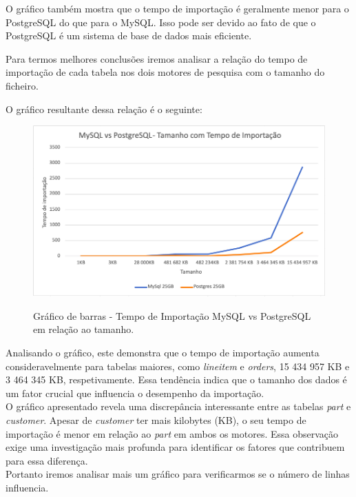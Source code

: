 \documentclass{article}
\begin{document}
O gráfico também mostra que o tempo de importação é geralmente menor para o PostgreSQL do que para o MySQL. Isso pode ser devido ao fato de que o PostgreSQL é um sistema de base de dados mais eficiente.

Para termos melhores conclusões iremos analisar a relação do tempo de importação de cada tabela nos dois motores de pesquisa com o tamanho do ficheiro.

O gráfico resultante dessa relação é o seguinte:

\begin{figure}[H]
  \centering
  \includegraphics[width=\textwidth]{Graphs/SizevsImport.png}\\
  \caption{Gráfico de barras - Tempo de Importação MySQL vs PostgreSQL em relação ao tamanho.}
  \label{fig:row_import_time2}
\end{figure}


Analisando o gráfico, este demonstra que o tempo de importação aumenta consideravelmente para tabelas maiores, como \textit{lineitem} e \textit{orders}, 15 434 957 KB e 3 464 345 KB, respetivamente. Essa tendência indica que o tamanho dos dados é um fator crucial que influencia o desempenho da importação.\\

O gráfico apresentado revela uma discrepância interessante entre as tabelas \textit{part} e \textit{customer}. Apesar de \textit{customer} ter mais kilobytes (KB), o seu tempo de importação é menor em relação ao \textit{part} em ambos os motores. Essa observação exige uma investigação mais profunda para identificar os fatores que contribuem para essa diferença.\\
Portanto iremos analisar mais um gráfico para verificarmos se o número de linhas influencia.\\
\end{document}
